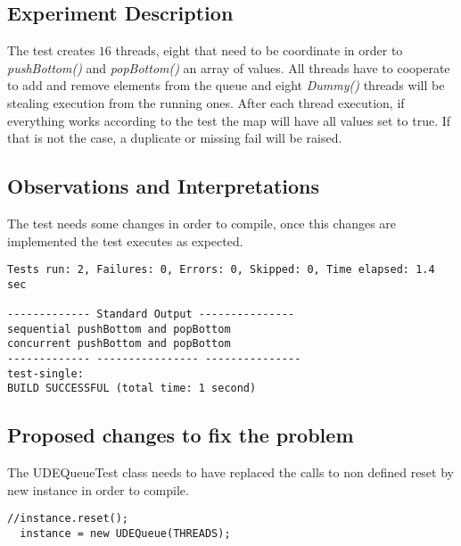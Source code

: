 
\subsection{Experiment Description} 
\par
The test creates $16$ threads, eight that need to be coordinate in order to \textit{pushBottom()} and \textit{popBottom()} an array of values. All threads have to cooperate to add and remove elements from the queue and eight \textit{Dummy()} threads will be stealing execution from the running ones. After each thread execution, if everything works according to the test the map will have all values set to true.
If that is not the case, a duplicate or missing fail will be raised.
\par



\subsection{Observations and Interpretations}

\par
The test needs some changes in order to compile, once this changes are implemented the test executes as expected.
\begin{lstlisting}[frame=single,breaklines=true]
Tests run: 2, Failures: 0, Errors: 0, Skipped: 0, Time elapsed: 1.4 sec

------------- Standard Output ---------------
sequential pushBottom and popBottom
concurrent pushBottom and popBottom
------------- ---------------- ---------------
test-single:
BUILD SUCCESSFUL (total time: 1 second)
\end{lstlisting}



\subsection{Proposed changes to fix the problem}

\par
The UDEQueueTest class needs to have replaced the calls to non defined reset by new instance in order to compile.
\begin{lstlisting}[frame=single,breaklines=true]
  //instance.reset();
  instance = new UDEQueue(THREADS);
\end{lstlisting}

